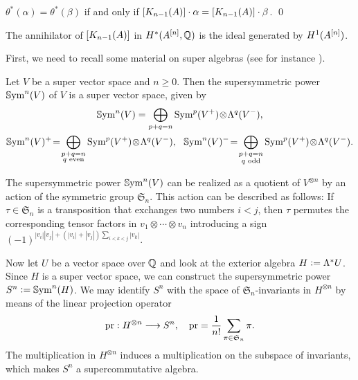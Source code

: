 \begin{corollary} \label{KummerEquality}
$\theta^*(\alpha) = \theta^*(\beta)$ if and only if $[\kum{A}{n-1}]\cdot \alpha = [\kum{A}{n-1}]\cdot \beta$. 
\qed
\end{corollary}

\begin{proposition}\label{Annihideal}
The annihilator of $[\kum{A}{n-1}]$ in $H^*(A\hilb{n},\Q)$ is the ideal generated by $H^1(A\hilb{n})$. 
\end{proposition}
First, we need to recall some material on super algebras (see for instance \cite{DeligneMorgan}).
\begin{definition}
Let $V$ be a super vector space and $n\geq 0$. Then the supersymmetric power $\SSym^n(V)$ of $V$ is a super vector space, given by
\begin{gather*}
\SSym^n(V) = \bigoplus_{p+q=n} \Sym^p(V^{+}) \!\otimes\! \Lambda^q(V^{-}), \\
\SSym^n(V)^{+}\! =\! \bigoplus_{\substack{p+q=n \\ q\text{ even} }} \Sym^p(V^{+}) \!\otimes\! \Lambda^q(V^{-}), \ \ 
\SSym^n(V)^{-}\! =\! \bigoplus_{\substack{p+q=n \\ q\text{ odd} }} \Sym^p(V^{+}) \!\otimes\! \Lambda^q(V^{-}).
\end{gather*}
\end{definition}
\begin{remark}
The supersymmetric power $\SSym^n (V)$ can be realized as a quotient of $V^{\otimes n}$ by an action of the symmetric group $\mathfrak S_n$. This action can be described as follows: If $\tau\in \mathfrak S_n$ is a transposition that exchanges two numbers $i<j$, then $\tau$ permutes the corresponding tensor factors in $v_1\otimes  \cdots\otimes v_n$ introducing a sign
$(-1)^{|v_i||v_j|+(|v_i|+|v_j|)\sum_{i<k<j} |v_k|}$.
\end{remark}

Now let $U$ be a vector space over $\Q$ and look at the exterior algebra $H\defIs  \Lambda^* U$. 
Since $H$ is a super vector space, we can construct the supersymmetric power $S^n\defIs  \SSym^n( H)$.
We may identify $S^n$ with the space of $\mathfrak S_n$-invariants in $H^{\otimes n}$ by means of the linear projection operator
$$
\pr : H^{\otimes n} \longrightarrow S^n , \quad \pr = \frac{1}{n!}\sum_{\pi \in\mathfrak S_n} \pi.
$$
The multiplication in $H^{\otimes n}$ induces a multiplication on the subspace of invariants, which makes $S^n$ a supercommutative algebra.

